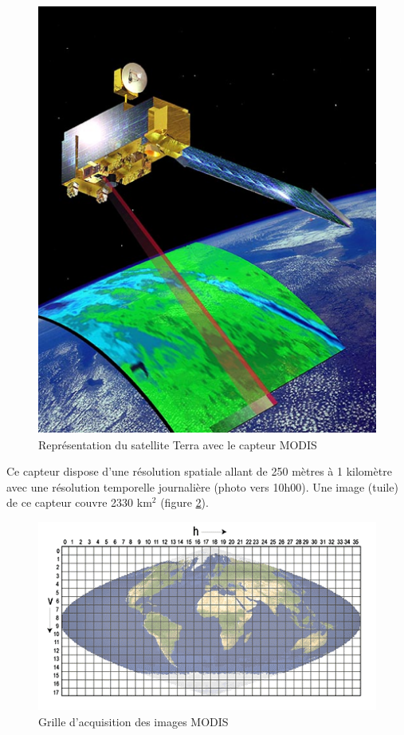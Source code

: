 \documentclass[10pt,a4paper]{article}
\begin{document}
\begin{figure}[!h]
\centering
\includegraphics[scale=0.4]{img/modis.png}
\caption{Représentation du satellite Terra avec le capteur MODIS}
\label{modis}
\end{figure}

Ce capteur dispose d'une résolution spatiale allant de 250 mètres à 1 kilomètre avec une résolution temporelle journalière (photo vers 10h00). Une image (tuile) de ce capteur couvre 2330 km$^2$ (figure \ref{modisGrid}).

\begin{figure}[!h]
\centering
\includegraphics[scale=0.7]{img/modisGrid.png}
\caption{Grille d'acquisition des images MODIS}
\label{modisGrid}
\end{figure}
\end{document}
